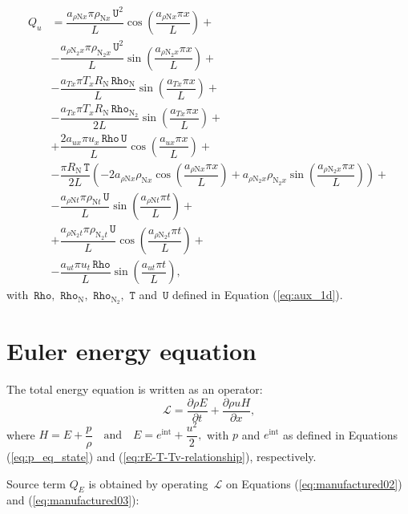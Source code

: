 \documentclass[10pt]{article}
\newcommand{\diff}[2] {\dfrac{\partial #1 }{\partial #2}}
\newcommand{\Lo}{\,\mathcal{L}}
\newcommand{\Rho}{\,\mathtt{Rho}}
\newcommand{\T}{\,\mathtt{T}}
\newcommand{\U}{\,\mathtt{U}}
\begin{document}
\begin{equation}
\begin{split}
Q_u &= \dfrac{a_{ \rho \text{N} x} \pi \rho_{\text{N}x} \U^2 }{L}\cos\left(\dfrac{a_{ \rho \text{N} x} \pi x}{L}\right)+\\
&-\dfrac{a_{ \rho \text{N}_2 x} \pi \rho_{\text{N}_2  x} \U^2 }{L}\sin\left(\dfrac{a_{ \rho \text{N}_2 x} \pi x}{L}\right)+\\
&-\dfrac{a_{Tx} \pi T_x R_\text{N} \Rho_\text{N} }{L}\sin\left(\dfrac{a_{Tx} \pi x}{L}\right)+\\
&-\dfrac{a_{Tx} \pi T_x R_\text{N} \Rho_{\text{N}_2} }{2L}\sin\left(\dfrac{a_{Tx} \pi x}{L}\right)+\\
&+\dfrac{2 a_{ux} \pi u_x \Rho \U }{L}\cos\left(\dfrac{a_{ux} \pi x}{L}\right)+\\
&-\dfrac{\pi R_\text{N} \T}{2L} \left(-2 a_{ \rho \text{N} x} \rho_{\text{N}x} \cos\left(\dfrac{a_{ \rho \text{N} x} \pi x}{L}\right)+a_{ \rho \text{N}_2 x} \rho_{\text{N}_2  x} \sin\left(\dfrac{a_{ \rho \text{N}_2 x} \pi x}{L}\right)\right)+\\
&-\dfrac{a_{ \rho \text{N} t} \pi \rho_{\text{N} t}  \U }{L}\sin\left(\dfrac{a_{ \rho \text{N} t} \pi t}{L}\right) +\\
&+\dfrac{a_{ \rho \text{N}_2 t} \pi \rho_{\text{N}_2 t}  \U }{L}\cos\left(\dfrac{a_{ \rho \text{N}_2 t} \pi t}{L}\right)+\\
&-\dfrac{a_{ut} \pi u_t \Rho }{L}\sin\left(\dfrac{a_{ut} \pi t}{L}\right),
\end{split}
\end{equation}
with $\Rho,\,\Rho_{\text{N}},\,\Rho_{\text{N}_2},\, \T$ and $\U$ defined in Equation (\ref{eq:aux_1d}).

\section{Euler energy equation}
The total energy equation is written as an operator:
\begin{equation*}
 \label{eq:euler1d_14}
\Lo =\diff{\rho E  }{t}+\diff{\rho u H}{x} ,
\end{equation*}
where $H= E+ \dfrac{p}{\rho} \quad \mbox{and}\quad E=e^{\text{int}} + \dfrac{u^2 }{2} ,$ with $p$ and $e^{\text{int}}$ as defined in Equations (\ref{eq:p_eq_state}) and (\ref{eq:rE-T-Tv-relationship}), respectively.

Source term $Q_E$ is obtained by operating $\Lo$ on Equations (\ref{eq:manufactured02}) and (\ref{eq:manufactured03}):
\end{document}
